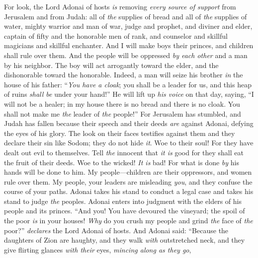 \begin{biblechapter} %
 For look, the Lord Adonai of hosts \textit{is} removing \textit{every source of support} 
from Jerusalem and from Judah: 
all of \textit{the} supplies of bread 
and all of \textit{the} supplies of water,
\verse mighty warrior and man of war, 
judge and prophet, 
and diviner and elder,
\verse captain of fifty and the honorable men of rank, 
and counselor and skillful magicians and skillful enchanter.
\verse And I will make boys their princes, 
and children shall rule over them.
\verse And the people will be oppressed \textit{by each other} 
and a man by his neighbor. 
The boy will act arrogantly toward the elder, 
and the dishonorable toward the honorable.
\verse Indeed, a man will seize his brother 
\textit{in} the house of his father: 
“\textit{You have a cloak}; 
you shall be a leader for us, 
and this heap of ruins \textit{shall be} under your hand!”
\verse He will lift up \textit{his voice} on that day, saying, 
“I will not be a healer; 
in my house there is no bread 
and there is no cloak. 
You shall not make me \textit{the} leader of \textit{the} people!”
\verse For Jerusalem has stumbled, 
and Judah has fallen 
because their speech and their deeds \textit{are} against Adonai, 
defying the eyes of his glory.
\verse The look on their faces testifies against them 
and they declare their sin like Sodom; 
they do not hide \textit{it}. 
Woe to their soul! 
For they have dealt out evil to themselves.
\verse Tell \textit{the} innocent that \textit{it is} good 
for they shall eat the fruit of their deeds.
\verse Woe to the wicked! \textit{It is} bad! 
For what is done \textit{by} his hands will be done to him.
\verse My people—children are their oppressors, 
and women rule over them. 
My people, your leaders are misleading \textit{you}, 
and they confuse the course of your paths.
\verse Adonai takes his stand to conduct a legal case 
and takes his stand to judge \textit{the} peoples.
\verse Adonai enters into judgment with the elders of his people and its princes. 
“And you! You have devoured the vineyard; 
the spoil of the poor \textit{is} in your houses!
\verse \textit{Why} do you crush my people 
and grind \textit{the} face of \textit{the} poor?” \textit{declares} the Lord Adonai of hosts.
 And Adonai said: “Because the daughters of Zion are haughty, 
and they walk \textit{with} outstretched neck, 
and they give flirting glances \textit{with their} eyes, 
\textit{mincing along as they go}, 

\end{biblechapter}
